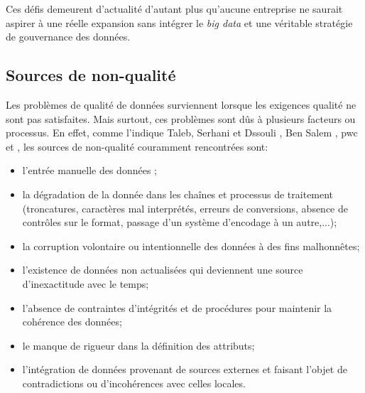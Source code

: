 Ces d\'efis demeurent d'actualit\'e d'autant plus qu'aucune entreprise ne saurait aspirer \`a une r\'eelle expansion sans int\'egrer le \textit{big data} et une v\'eritable strat\'egie de gouvernance des donn\'ees. 

\subsection{Sources de non-qualit\'e}
Les problèmes de qualité de données surviennent lorsque les exigences qualité ne sont pas satisfaites. Mais surtout, ces problèmes sont d\^us à plusieurs facteurs ou processus. En effet, comme l'indique Taleb, Serhani et Dssouli \cite{BigDataQlt}, Ben Salem \cite{bensalem}, pwc \cite{pwc_micro_ebg_2011} et \cite{TalanConsulting}, les sources de non-qualit\'e couramment rencontr\'ees sont:
\begin{itemize}[parsep=0cm,itemsep=0cm]
\item l'entr\'ee manuelle des donn\'ees ;

\item la dégradation de la donnée dans les chaînes et processus de traitement (troncatures, caractères mal interprétés, erreurs de conversions, absence de contrôles sur le format, passage d'un syst\`eme d'encodage \`a un autre,...);

\item la corruption volontaire ou intentionnelle des donn\'ees \`a des fins malhonnêtes;

\item l'existence de données non actualisées qui deviennent une source d’inexactitude avec le temps;


\item l'absence de contraintes d'intégrités et de procédures pour maintenir la cohérence des donn\'ees;

\item le manque de rigueur dans la définition des attributs;

\item l'int\'egration de donn\'ees provenant de sources externes et faisant l'objet de contradictions ou d'incoh\'erences avec celles locales.

\end{itemize}

